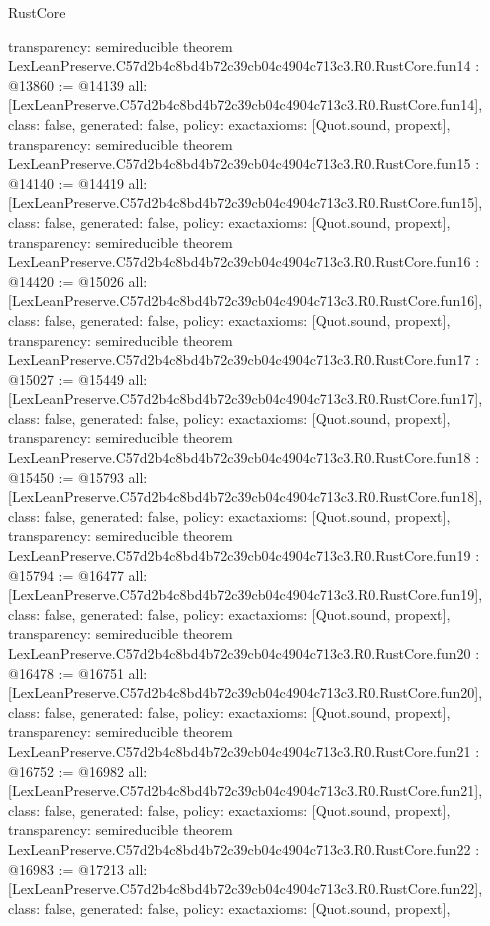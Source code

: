 \begin{lexlean}{RustCore}
\begin{coremodule}
{  transparency: semireducible
}
theorem LexLeanPreserve.C57d2b4c8bd4b72c39cb04c4904c713c3.R0.RustCore.fun14 : @13860 := @14139 {
  all: [LexLeanPreserve.C57d2b4c8bd4b72c39cb04c4904c713c3.R0.RustCore.fun14],
  class: false,
  generated: false,
  policy: exact{axioms: [Quot.sound, propext]},
  transparency: semireducible
}
theorem LexLeanPreserve.C57d2b4c8bd4b72c39cb04c4904c713c3.R0.RustCore.fun15 : @14140 := @14419 {
  all: [LexLeanPreserve.C57d2b4c8bd4b72c39cb04c4904c713c3.R0.RustCore.fun15],
  class: false,
  generated: false,
  policy: exact{axioms: [Quot.sound, propext]},
  transparency: semireducible
}
theorem LexLeanPreserve.C57d2b4c8bd4b72c39cb04c4904c713c3.R0.RustCore.fun16 : @14420 := @15026 {
  all: [LexLeanPreserve.C57d2b4c8bd4b72c39cb04c4904c713c3.R0.RustCore.fun16],
  class: false,
  generated: false,
  policy: exact{axioms: [Quot.sound, propext]},
  transparency: semireducible
}
theorem LexLeanPreserve.C57d2b4c8bd4b72c39cb04c4904c713c3.R0.RustCore.fun17 : @15027 := @15449 {
  all: [LexLeanPreserve.C57d2b4c8bd4b72c39cb04c4904c713c3.R0.RustCore.fun17],
  class: false,
  generated: false,
  policy: exact{axioms: [Quot.sound, propext]},
  transparency: semireducible
}
theorem LexLeanPreserve.C57d2b4c8bd4b72c39cb04c4904c713c3.R0.RustCore.fun18 : @15450 := @15793 {
  all: [LexLeanPreserve.C57d2b4c8bd4b72c39cb04c4904c713c3.R0.RustCore.fun18],
  class: false,
  generated: false,
  policy: exact{axioms: [Quot.sound, propext]},
  transparency: semireducible
}
theorem LexLeanPreserve.C57d2b4c8bd4b72c39cb04c4904c713c3.R0.RustCore.fun19 : @15794 := @16477 {
  all: [LexLeanPreserve.C57d2b4c8bd4b72c39cb04c4904c713c3.R0.RustCore.fun19],
  class: false,
  generated: false,
  policy: exact{axioms: [Quot.sound, propext]},
  transparency: semireducible
}
theorem LexLeanPreserve.C57d2b4c8bd4b72c39cb04c4904c713c3.R0.RustCore.fun20 : @16478 := @16751 {
  all: [LexLeanPreserve.C57d2b4c8bd4b72c39cb04c4904c713c3.R0.RustCore.fun20],
  class: false,
  generated: false,
  policy: exact{axioms: [Quot.sound, propext]},
  transparency: semireducible
}
theorem LexLeanPreserve.C57d2b4c8bd4b72c39cb04c4904c713c3.R0.RustCore.fun21 : @16752 := @16982 {
  all: [LexLeanPreserve.C57d2b4c8bd4b72c39cb04c4904c713c3.R0.RustCore.fun21],
  class: false,
  generated: false,
  policy: exact{axioms: [Quot.sound, propext]},
  transparency: semireducible
}
theorem LexLeanPreserve.C57d2b4c8bd4b72c39cb04c4904c713c3.R0.RustCore.fun22 : @16983 := @17213 {
  all: [LexLeanPreserve.C57d2b4c8bd4b72c39cb04c4904c713c3.R0.RustCore.fun22],
  class: false,
  generated: false,
  policy: exact{axioms: [Quot.sound, propext]},
}
\end{coremodule}
\end{lexlean}
